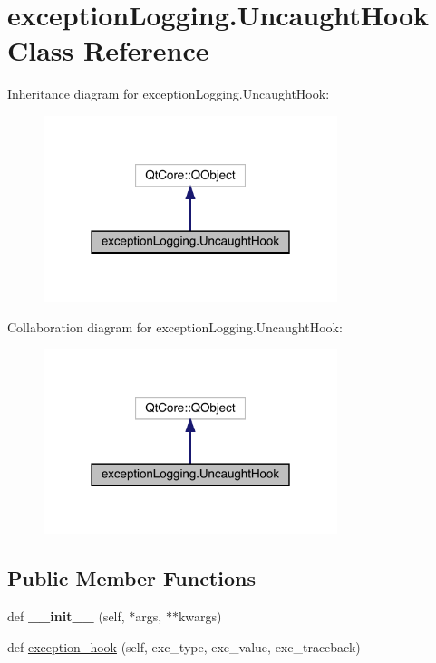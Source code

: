 \hypertarget{classexception_logging_1_1_uncaught_hook}{}\section{exception\+Logging.\+Uncaught\+Hook Class Reference}
\label{classexception_logging_1_1_uncaught_hook}


Inheritance diagram for exception\+Logging.\+Uncaught\+Hook\+:\nopagebreak
\begin{figure}[H]
\begin{center}
\leavevmode
\includegraphics[width=243pt]{classexception_logging_1_1_uncaught_hook__inherit__graph}
\end{center}
\end{figure}


Collaboration diagram for exception\+Logging.\+Uncaught\+Hook\+:\nopagebreak
\begin{figure}[H]
\begin{center}
\leavevmode
\includegraphics[width=243pt]{classexception_logging_1_1_uncaught_hook__coll__graph}
\end{center}
\end{figure}
\subsection*{Public Member Functions}
\begin{DoxyCompactItemize}
\item 
\mbox{\label{classexception_logging_1_1_uncaught_hook_afffeca2912b4bb3e1a97358c2d5e354d}} 
def {\bfseries \+\_\+\+\_\+init\+\_\+\+\_\+} (self, $\ast$args, $\ast$$\ast$kwargs)
\item 
def \mbox{\hyperlink{classexception_logging_1_1_uncaught_hook_a33bf5181b6444bdcf7946dd96dc1d773}{exception\+\_\+hook}} (self, exc\+\_\+type, exc\+\_\+value, exc\+\_\+traceback)
\end{DoxyCompactItemize}



